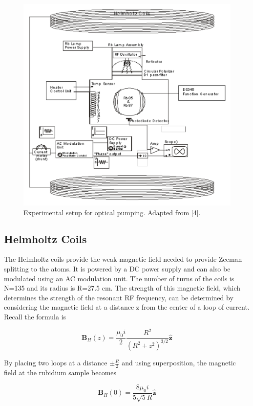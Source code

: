 \documentclass[%
 aip,
rsi,%
 amsmath,amssymb,
 reprint,%
author-numerical,%
]{revtex4-1}
\begin{document}
\begin{figure}
\includegraphics[width=0.9\linewidth]{lateximages/equipment} 
\caption{\label{fig:equipment}  Experimental setup for optical pumping. Adapted from [4]. }
\end{figure}

\subsection{Helmholtz Coils}
The Helmholtz coils provide the weak magnetic field needed to provide Zeeman splitting to the atoms. It is powered by a DC power supply and can also be modulated using an AC modulation unit. The number of turns of the coils is N=135 and its radius is R=27.5 cm. The strength of this magnetic field, which determines the strength of the resonant RF frequency, can be determined by considering the magnetic field at a distance z from the center of a loop of current. Recall the formula is 


\begin{equation}
\mathbf { B }_{H} ( z ) = \frac { \mu _ { 0 } i } { 2 } \frac { R ^ { 2 } } { \left( R ^ { 2 } + z ^ { 2 } \right) ^ { 3 / 2 } } \hat { \mathbf { z } }
\label{eq:nine}
\end{equation}

By placing two loops at a distance $\pm\frac{R}{2}$ and using superposition, the magnetic field at the rubidium sample becomes

\begin{equation}
\mathbf { B }_{H} ( 0 ) = \frac { 8 \mu _ { 0 } i } { 5 \sqrt { 5 } R } \hat { \mathbf { z } }
\label{eq:ten}
\end{equation}
\end{document}
